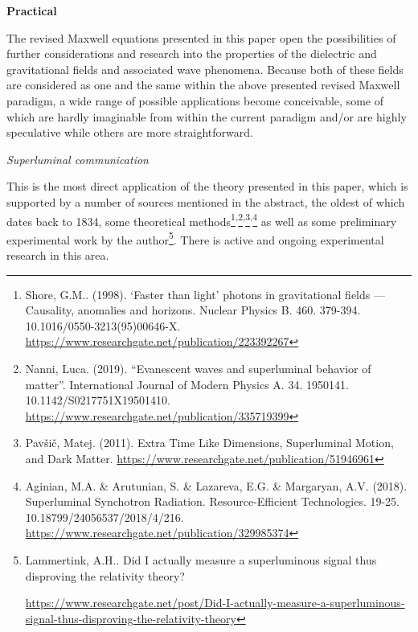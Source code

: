\documentclass[a4paper]{article}
\newcommand\textstyleNone[1]{#1}
\newcommand\textstyleInternetlink[1]{#1}
\begin{document}
{
\textstyleNone{\textbf{{Practical}}}}

{
\textstyleNone{{The revised Maxwell equations presented in this
paper open the possibilities of further considerations and research into the properties of the dielectric and
gravitational fields and associated wave phenomena. Because both of these fields are considered as one and the same
within the above presented revised Maxwell paradigm, a wide range of possible applications become conceivable, some of
which are hardly imaginable from within the current paradigm and/or are highly speculative while others are more
straightforward.}}}

{
\textstyleNone{\textit{{Superluminal communication}}}}

{
\textstyleNone{{This is the most direct application of the theory
presented in this paper, which is supported by a number of sources mentioned in the abstract, the oldest of which dates
back to 1834, some theoretical methods}}\footnote{\textstyleNone{ Shore, G.M.. (1998). `Faster than light' photons in
gravitational fields --- Causality, anomalies and horizons. Nuclear Physics B. 460. 379-394.
10.1016/0550-3213(95)00646-X. }\url{https://www.researchgate.net/publication/223392267}\textstyleInternetlink{ }\par
}\textstyleNone{{\textsuperscript{,}}}\footnote{\textstyleNone{
Nanni, Luca. (2019). ``Evanescent waves and superluminal behavior of matter''. International Journal of Modern Physics
A. 34. 1950141. 10.1142/S0217751X19501410.
}\url{https://www.researchgate.net/publication/335719399}\textstyleInternetlink{ }\par
}\textstyleNone{{\textsuperscript{,}}}\footnote{\textstyleNone{
Pav\v{s}i\v{c}, Matej. (2011). Extra Time Like Dimensions, Superluminal Motion, and Dark Matter.
}\url{https://www.researchgate.net/publication/51946961}\textstyleInternetlink{ }\par
}\textstyleNone{{\textsuperscript{,}}}\footnote{ Aginian, M.A. \&
Arutunian, S. \& Lazareva, E.G. \& Margaryan, A.V. (2018). Superluminal Synchotron Radiation. Resource-Efficient
Technologies. 19-25. 10.18799/24056537/2018/4/216. \url{https://www.researchgate.net/publication/329985374}  \par
}\textstyleNone{{ as well as some preliminary experimental work by
the author}}\footnote{ Lammertink, A.H..  Did I actually measure a superluminous signal thus disproving the relativity
theory? \par
\url{https://www.researchgate.net/post/Did-I-actually-measure-a-superluminous-signal-thus-disproving-the-relativity-theory}
\par  }\textstyleNone{{. There is active and ongoing experimental
research in this area.}}}
\end{document}
